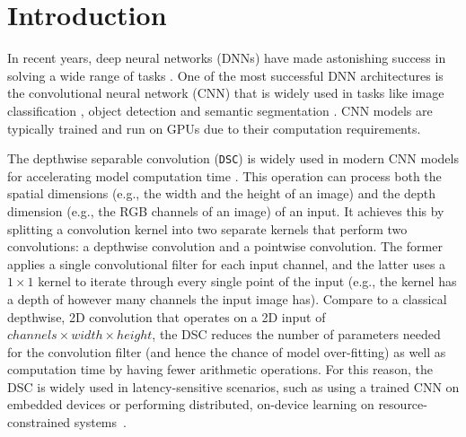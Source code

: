 \section{Introduction}

In recent years, deep neural networks (DNNs) have made astonishing success in solving a wide range of tasks \cite{zhang2018diverse,song2018deep,Cai_2018_CVPR,Sandler_2018_CVPR,briot2018analysis,tokunaga2019adaptive}. One of the
most successful DNN architectures is the convolutional neural network (CNN) that is widely used in tasks like image classification
\cite{zhang2018diverse,song2018deep}, object detection \cite{Cai_2018_CVPR,Sandler_2018_CVPR} and  semantic segmentation \cite{briot2018analysis,tokunaga2019adaptive}. CNN models are typically trained and run on
GPUs due to their computation requirements.


The depthwise separable convolution (\texttt{DSC}) is widely used in modern CNN models for accelerating model computation time
\cite{howard2019searching,tan2019efficientnet,Ma_2018_ECCV,Sandler_2018_CVPR}. This operation can process both the spatial dimensions (e.g., the width and the height of an image) and the depth
dimension (e.g., the RGB channels of an image) of an input. It achieves this by splitting a convolution kernel into two separate kernels
that perform two convolutions: a depthwise convolution and a pointwise convolution. The former applies a single convolutional filter for
each input channel, and the latter uses a $1 \times 1$ kernel to iterate through every single point of the input (e.g., the kernel has a
depth of however many channels the input image has). Compare to a classical depthwise, 2D convolution that operates on a 2D input of
$channels \times width \times height$, the DSC reduces the number of parameters needed for the convolution filter (and hence the chance of
model over-fitting) as well as computation time by having fewer arithmetic operations. For this reason, the DSC is widely used in
latency-sensitive scenarios, such as using a trained CNN on embedded devices or performing distributed, on-device learning on
resource-constrained systems~\cite{espeholt2019seed}.


